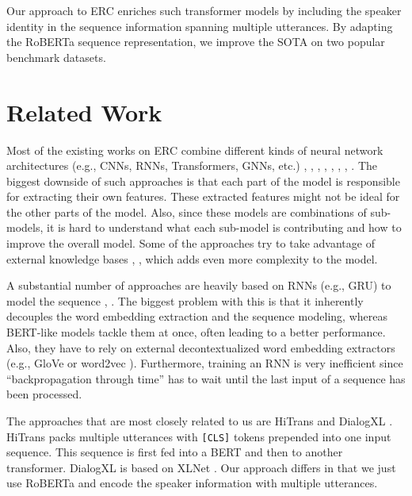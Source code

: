 \documentclass[11pt]{article}
\begin{document}
Our approach to ERC enriches such transformer models by including the speaker identity in the sequence information spanning multiple utterances. By adapting the RoBERTa sequence representation, we improve the SOTA on two popular benchmark datasets.



\section{Related Work}
\label{sec:related}

Most of the existing works on ERC combine different kinds of neural network architectures (e.g., CNNs, RNNs, Transformers, GNNs, etc.) \citep{Li2021MultiTaskLW}, \citep{Li2020BiERUBE}, \citep{ishiwatari-etal-2020-relation}, \citep{wang-etal-2020-contextualized}, \citep{HAZARIKA20211}, \citep{sheng-etal-2020-summarize}, \citep{ghosal-etal-2020-cosmic}, \citep{DBLP:journals/corr/abs-1908-11540}. The biggest downside of such approaches is that each part of the model is responsible for extracting their own features. These extracted features might not be ideal for the other parts of the model. Also, since these models are combinations of sub-models, it is hard to understand what each sub-model is contributing and how to improve the overall model. Some of the approaches try to take advantage of external knowledge bases \citep{ghosal-etal-2020-cosmic}, \citep{DBLP:journals/corr/abs-1909-10681}, which adds even more complexity to the model.

A substantial number of approaches are heavily based on RNNs (e.g., GRU) to model the sequence \citep{DBLP:journals/corr/abs-1911-09075}, \citep{lu-etal-2020-iterative}. The biggest problem with this is that it inherently decouples the word embedding extraction and the sequence modeling, whereas BERT-like models tackle them at once, often leading to a better performance. Also, they have to rely on external decontextualized word embedding extractors (e.g., GloVe \citep{pennington-etal-2014-glove} or word2vec \citep{10.5555/2999792.2999959}). Furthermore, training an RNN is very inefficient since ``backpropagation through time'' has to wait until the last input of a sequence has been processed. 

The approaches that are most closely related to us are HiTrans \citep{li-etal-2020-hitrans} and DialogXL \citep{DBLP:journals/corr/abs-2012-08695}. HiTrans packs multiple utterances with \texttt{[CLS]} tokens prepended into one input sequence. This sequence is first fed into a BERT and then to another transformer. DialogXL is based on XLNet \citep{DBLP:journals/corr/abs-1906-08237}. Our approach differs in that we just use RoBERTa and encode the speaker information with multiple utterances.
\end{document}
